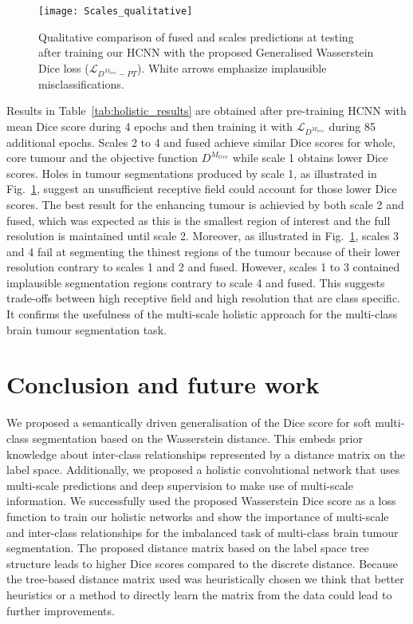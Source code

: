 \documentclass[runningheads,orivec,a4paper]{llncs}
\begin{document}
\begin{figure}[tb]
	\centering
	\texttt{[image: Scales\_qualitative]}
	\caption{Qualitative comparison of fused and scales predictions at testing after training our HCNN with the proposed Generalised Wasserstein Dice loss ($\mathcal{L}_{D^{M_{tree}}-PT}$). White arrows emphasize implausible misclassifications.}
	\label{fig:scales_quali}
\end{figure}

Results in Table~\ref{tab:holistic_results} are obtained after pre-training HCNN with mean Dice score during 4 epochs and then training it with $\mathcal{L}_{D^{M_{tree}}}$ during 85 additional epochs.
%
Scales 2 to 4 and fused achieve similar Dice scores for whole, core tumour and the objective function $D^{M_{tree}}$ while scale 1 obtains lower Dice scores. Holes in tumour segmentations produced by scale 1, as illustrated in Fig.~\ref{fig:scales_quali}, suggest an unsufficient receptive field could account for those lower Dice scores.
%
The best result for the enhancing tumour is achievied by both scale 2 and fused, which was expected as this is the smallest region of interest and the full resolution is maintained until scale 2.
%
Moreover, as illustrated in Fig.~\ref{fig:scales_quali}, scales 3 and 4 fail at segmenting the thinest regions of the tumour because of their lower resolution contrary to scales 1 and 2 and fused.
%
However, scales 1 to 3 contained implausible segmentation regions contrary to scale 4 and fused.
%
This suggests trade-offs between high receptive field and high resolution that are class specific. It confirms the usefulness of the multi-scale holistic approach for the multi-class brain tumour segmentation task.



\section{Conclusion and future work}

We proposed a semantically driven generalisation of the Dice score for
soft multi-class segmentation based on the Wasserstein distance. This
embeds prior knowledge about inter-class relationships represented by
a distance  matrix on the label space. 
Additionally, we proposed a holistic convolutional network that uses
multi-scale predictions and deep supervision to make use of multi-scale
information. 
We successfully used the proposed Wasserstein Dice score as a loss
function to train our holistic networks and show the
importance of multi-scale and inter-class relationships for the
imbalanced task of multi-class brain tumour segmentation.
%
The proposed distance matrix based on the label space tree structure leads to higher Dice scores compared to the discrete distance.
Because the tree-based distance matrix used was heuristically chosen we think that better heuristics or a method to directly learn the matrix from the data could lead to further improvements.
\end{document}
